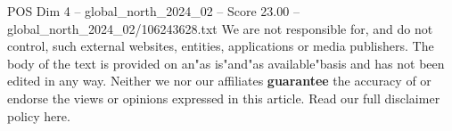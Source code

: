 \begin{textsample}{POS Dim 4 – global\_north\_2024\_02 – Score 23.00 – global\_north\_2024\_02/106243628.txt}
We are not responsible for, and do not control, such external websites, entities, applications or media publishers.
The body of the text is provided on an"as is"and"as available"basis and has not been edited in any way.
Neither we nor our affiliates \textbf{guarantee} the accuracy of or endorse the views or opinions expressed in this article.
Read our full disclaimer policy here.

\end{textsample}
